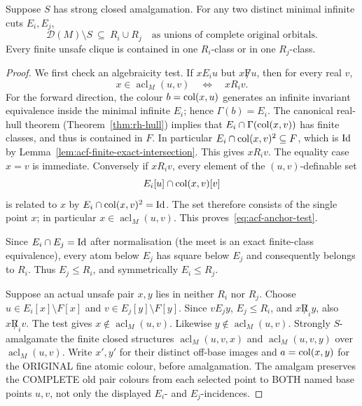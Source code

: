 \begin{lemma}
\label{lem:acf-unsafe-concentration}
Suppose \(S\) has strong closed amalgamation.  For any two
distinct minimal infinite cuts \(E_i,E_j\),
\[
   \mathcal D(M)\setminus S\ \subseteq\ R_i\cup R_j
   \quad\text{as unions of complete original orbitals}.
\]
Every finite unsafe clique is contained in one \(R_i\)-class
or in one \(R_j\)-class.
\end{lemma}
\begin{proof}
We first check an algebraicity test.  If \(xE_i u\) but
\(x\not F u\), then for every real \(v\),
\[
  x\in\operatorname{acl}_M(u,v)
             \quad\Longleftrightarrow\quad xR_i v.
  \tag{\(\dagger\)}\label{eq:acf-anchor-test}
\]
For the forward direction, the colour \(b=\operatorname{col}(x,u)\)
generates an infinite invariant equivalence inside the
minimal infinite \(E_i\); hence \(\Gamma(b)=E_i\).
The canonical real-hull theorem
(Theorem~\ref{thm:rh-hull}) implies that
\(E_i\cap\Gamma(\operatorname{col}(x,v))\) has finite classes, and thus is
contained in \(F\).  In particular
\(E_i\cap\operatorname{col}(x,v)^2\subseteq F\), which is \(\mathrm{Id}\) by
Lemma~\ref{lem:acf-finite-exact-intersection}.  This gives
\(xR_i v\).  The equality case \(x=v\) is immediate.
Conversely if \(xR_i v\), every element of the
\((u,v)\)-definable set
\[
       E_i[u]\cap\operatorname{col}(x,v)[v]
\]
is related to \(x\) by \(E_i\cap\operatorname{col}(x,v)^2=\mathrm{Id}\).
The set therefore consists of the single point \(x\);
in particular \(x\in\operatorname{acl}_M(u,v)\).
This proves~\eqref{eq:acf-anchor-test}.

Since \(E_i\cap E_j=\mathrm{Id}\) after normalisation (the meet
is an exact finite-class equivalence), every atom below
\(E_j\) has square below \(E_j\) and consequently belongs
to \(R_i\).  Thus \(E_j\le R_i\), and symmetrically
\(E_i\le R_j\).

Suppose an actual unsafe pair \(x,y\) lies in neither
\(R_i\) nor \(R_j\).  Choose \(u\in E_i[x]\setminus F[x]\)
and \(v\in E_j[y]\setminus F[y]\).  Since \(vE_jy\),
\(E_j\le R_i\), and \(x\not R_i y\), also \(x\not R_i v\).
The test gives \(x\notin\operatorname{acl}_M(u,v)\).
Likewise \(y\notin\operatorname{acl}_M(u,v)\).
Strongly \(S\)-amalgamate the finite closed structures
\(\operatorname{acl}_M(u,v,x)\) and
\(\operatorname{acl}_M(u,v,y)\) over
\(\operatorname{acl}_M(u,v)\).
Write \(x',y'\) for their distinct
off-base images and
\(a=\operatorname{col}(x,y)\) for the ORIGINAL
fine atomic colour, before amalgamation.
The amalgam preserves the COMPLETE
old pair colours from each
selected point to BOTH named
base points \(u,v\), not only the
displayed \(E_i\)- and \(E_j\)-incidences.


\end{proof}
